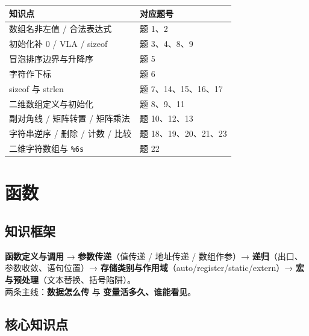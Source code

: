 \documentclass[UTF8,zihao=-4,a4paper]{ctexart}
\begin{document}
\begin{tipbox}[自测指路 · 第 4 章]
\begin{tabularx}{\linewidth}{p{5.4cm} X}
\toprule
知识点 & 对应题号\\
\midrule
数组名非左值 / 合法表达式 & 题 1、2\\
初始化补 0 / VLA / sizeof & 题 3、4、8、9\\
冒泡排序边界与升降序 & 题 5\\
字符作下标 & 题 6\\
sizeof 与 strlen & 题 7、14、15、16、17\\
二维数组定义与初始化 & 题 8、9、11\\
副对角线 / 矩阵转置 / 矩阵乘法 & 题 10、12、13\\
字符串逆序 / 删除 / 计数 / 比较 & 题 18、19、20、21、23\\
二维字符数组与 \texttt{\%6s} & 题 22\\
\bottomrule
\end{tabularx}
\end{tipbox}


\section{函数}

\subsection{知识框架}

\begin{keybox}[本章脉络]
\textbf{函数定义与调用} → \textbf{参数传递}（值传递 / 地址传递 / 数组作参）→ \textbf{递归}（出口、参数收敛、语句位置）→ \textbf{存储类别与作用域}（auto/register/static/extern）→ \textbf{宏与预处理}（文本替换、括号陷阱）。\\
两条主线：\textbf{数据怎么传} 与 \textbf{变量活多久、谁能看见}。
\end{keybox}

\subsection{核心知识点}
\end{document}
